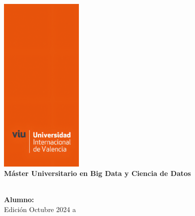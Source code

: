 \thispagestyle{empty}
\begin{center}
    \vspace*{-4.2cm} %
    \includegraphics[width=0.3\textwidth]{VIU-Title.png}\\[1cm] %
    \vspace*{1cm}
    \textbf{\LARGE Máster Universitario en Big Data y Ciencia de Datos}\\[0.5cm]
    \textit{\MakeUppercase{\mytitle}}\\[2cm]
    \vspace*{3cm}
    \begin{flushleft}
        \textbf{Alumno:} \textit{\MakeUppercase{\myauthor}}\\[0.5cm]
        Edición Octubre 2024 a \textbf{\mydate}
    \end{flushleft}
\end{center}
\pagebreak

